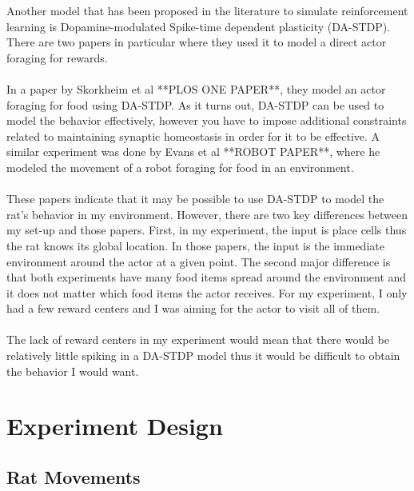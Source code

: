 \documentclass[conference]{IEEEtran}
\begin{document}
Another model that has been proposed in the literature to simulate reinforcement learning is Dopamine-modulated Spike-time dependent plasticity (DA-STDP). There are two papers in particular where they used it to model a direct actor foraging for rewards. \\
\\
In a paper by Skorkheim et al **PLOS ONE PAPER**, they model an actor foraging for food using DA-STDP. As it turns out, DA-STDP can be used to model the behavior effectively, however you have to impose additional constraints related to maintaining synaptic homeostasis in order for it to be effective. A similar experiment was done by Evans et al **ROBOT PAPER**, where he modeled the movement of a robot foraging for food in an environment. \\
\\
These papers indicate that it may be possible to use DA-STDP to model the rat's behavior in my environment. However, there are two key differences between my set-up and those papers. First, in my experiment, the input is place cells thus the rat knows its global location. In those papers, the input is the immediate environment around the actor at a given point. The second major difference is that both experiments have many food items spread around the environment and it does not matter which food items the actor receives. For my experiment, I only had a few reward centers and I was aiming for the actor to visit all of them. \\
\\
The lack of reward centers in my experiment would mean that there would be relatively little spiking in a DA-STDP model thus it would be difficult to obtain the behavior I would want. 



\section{Experiment Design}

\subsection{Rat Movements}
\end{document}
